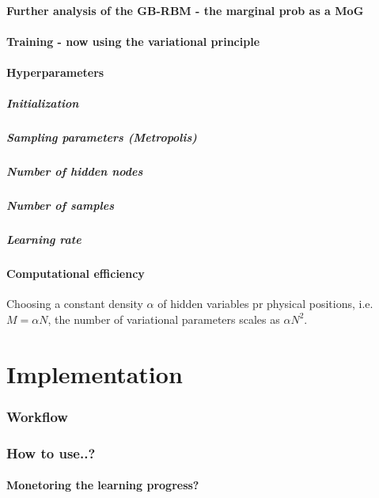 \documentclass[twoside,english]{uiofysmaster}
\begin{document}
\subsection{Further analysis of the GB-RBM - the marginal prob as a MoG}
\subsection{Training - now using the variational principle}
\subsection{Hyperparameters}
\subsubsection{Initialization}
\subsubsection{Sampling parameters (Metropolis)}
\subsubsection{Number of hidden nodes}
\subsubsection{Number of samples}
\subsubsection{Learning rate}
\subsection{Computational efficiency}
Choosing a constant density $\alpha$ of hidden variables pr physical positions, i.e. $M=\alpha N$, the number of variational parameters scales as $\alpha N^2$.

\part{Implementation}
\section{Workflow}
\section{How to use..?}
\subsection{Monetoring the learning progress?}
\end{document}
